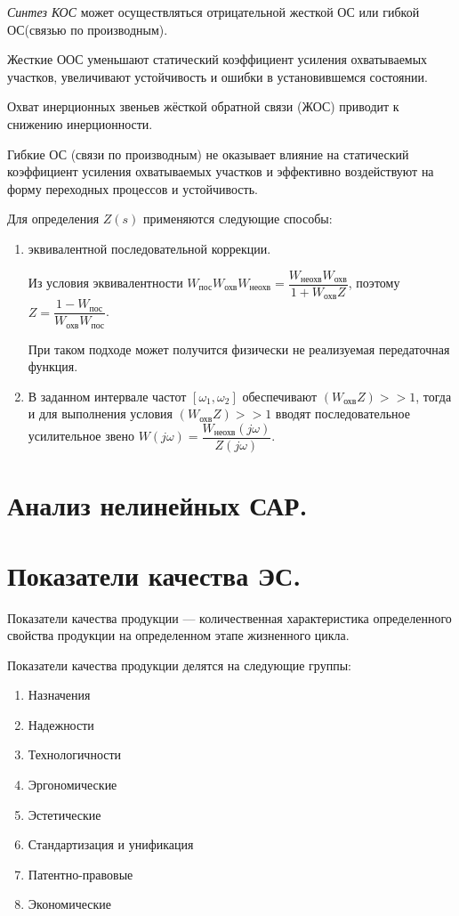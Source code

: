 \documentclass[unicode, 12pt, a4paper, oneside]{article}
\begin{document}
\textit{Синтез КОС} может осуществляться отрицательной жесткой ОС или гибкой ОС(связью по производным).

Жесткие ООС уменьшают статический коэффициент усиления охватываемых участков, увеличивают устойчивость и ошибки в установившемся состоянии.

Охват инерционных звеньев жёсткой обратной связи (ЖОС) приводит к снижению инерционности.

Гибкие ОС (связи по производным) не оказывает влияние на статический коэффициент усиления охватываемых участков и эффективно воздействуют на форму переходных процессов и устойчивость.

Для определения $ Z(s) $ применяются следующие способы: 
\begin{enumerate}
\item эквивалентной последовательной коррекции.
\par Из условия эквивалентности
$ W_\text{пос} W_\text{охв} W_\text{неохв}  = \dfrac{W_\text{неохв} W_\text{охв}}{1 + W_\text{охв} Z} $, поэтому 
$ Z = \dfrac{1 - W_\text{пос}}{W_\text{охв} W_\text{пос}} $.
\par При таком подходе может получится физически не реализуемая передаточная функция.
\item В заданном интервале частот $ [\omega_1, \omega_2] $ обеспечивают $ ( W_\text{охв} Z ) >> 1 $, тогда  и для выполнения условия  $ (W_\text{охв} Z)  >> 1 $ вводят последовательное усилительное звено $ W(j\omega) = \dfrac{W_\text{неохв}(j\omega)}{Z(j\omega)} $.
\end{enumerate}


\section{Анализ нелинейных САР.}



\section{Показатели качества ЭС.}

Показатели качества продукции --- количественная характеристика определенного свойства продукции на определенном этапе жизненного цикла.

Показатели качества продукции делятся на следующие группы:
\begin{enumerate}
\item Назначения
\item Надежности
\item Технологичности
\item Эргономические
\item Эстетические
\item Стандартизация и унификация
\item Патентно-правовые
\item Экономические
\end{enumerate}
\end{document}
